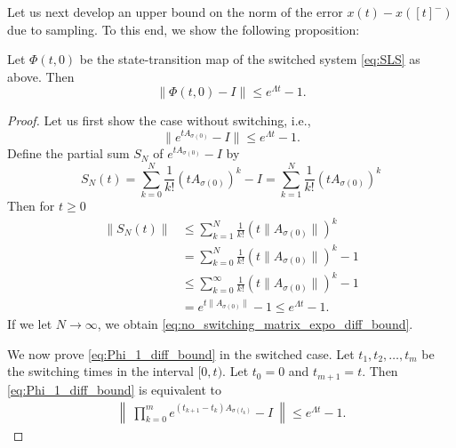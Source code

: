 \documentclass[a4, 11pt]{article}
\begin{document}
Let us next develop an upper bound on the norm of
the error $x(t) - x([t]^-)$ due to sampling.
To this end, 
we show the following proposition:
\begin{proposition}
\label{prop:state_transition_bound}
Let $\Phi(t,0)$ be the state-transition map of 
the switched system \eqref{eq:SLS}
as above. Then
\begin{equation}
\label{eq:Phi_1_diff_bound}
\|\Phi(t,0) - I\| \leq e^{\Lambda t} - 1.
\end{equation}
\end{proposition}


\begin{proof}
Let us first show the case without switching, i.e.,
\begin{equation}
\label{eq:no_switching_matrix_expo_diff_bound}
\|e^{tA_{\sigma(0)}} - I \| \leq e^{\Lambda t} - 1.
\end{equation}
Define the partial sum $S_N$ of $e^{tA_{\sigma(0)}} - I$ by
\begin{equation*}
S_N(t) = 
\sum_{k=0}^N \frac{1}{k!} (tA_{\sigma(0)})^k - I
=
\sum_{k=1}^N \frac{1}{k!} (tA_{\sigma(0)})^k 
\end{equation*}
Then for $t \geq 0$
\begin{align*}
\|S_N(t)\| &\leq
\sum_{k=1}^N \frac{1}{k!} \left(t\|A_{\sigma(0)}\| \right)^k  \\
&=\sum_{k=0}^N \frac{1}{k!} \left(t\|A_{\sigma(0)}\|\right)^k  - 1\\
&\leq \sum_{k=0}^\infty \frac{1}{k!} \left(t\|A_{\sigma(0)}\|\right)^k  - 1\\
&= e^{t\|A_{\sigma(0)}\|} - 1 
\leq e^{\Lambda t} - 1.
\end{align*}
If we let $N \to \infty$, we obtain \eqref{eq:no_switching_matrix_expo_diff_bound}.

We now prove \eqref{eq:Phi_1_diff_bound}
in the switched case.
Let $t_1,t_2,\dots,t_m$ be the switching times in the interval $[0,t)$.
Let $t_0 = 0$ and $t_{m+1} = t$.
Then \eqref{eq:Phi_1_diff_bound} is equivalent to
\begin{align}
\left\|~
\prod_{k=0}^{m} 
e^{(t_{k+1} - t_{k})A_{\sigma(t_{k})}}- I~
\right\| 
\leq e^{\Lambda t} - 1.
\label{eq:matrix_expo_diff_bound}
\end{align}


\end{proof}
\end{document}
